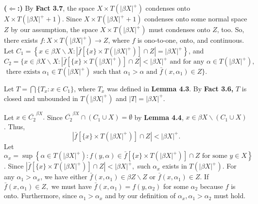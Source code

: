 \documentclass{article}
\begin{document}
																																				  \vskip 20pt

																																				  \textbf{($\Leftarrow$:)} By \textbf{Fact 3.7}, the space $X\times T(|\beta X|^+)$ condenses onto $X\times T(|\beta X|^+ +1).$ 
																																				  Since $X\times T(|\beta X|^+ +1)$ condenses onto some normal space $Z$ by our assumption, the space $X\times T(|\beta X|^+)$ must condenses onto $Z$, too. 
																																				  So, there exists $f: X\times T(|\beta X|^+) \rightarrow Z$, where $f$ is ono-to-one, onto, and continuous. 
																																				  Let \vskip 10pt
																																				  $C_1=\left\{x\in  \beta X \backslash X: |\bar{f}[\{x\} \times T(|\beta X|^+)] \cap Z|=|\beta X|^+\right\}$, and \vskip 10pt
																																				  $C_2=\{x\in \beta X\backslash X: \left|\bar{f}[\{x\}\times T(|\beta X|^+)]\cap Z\right|<|\beta X|^+ \mbox{ and for any }\alpha\in T(|\beta X|^+),$\\ $\mbox{ there exists }\alpha_1\in T(|\beta X|^+)\mbox{ such that }\alpha_1 >\alpha \mbox{ and } \bar{f}(x,\alpha_1) \in Z \}.$

																																				  \vskip 15pt
																																				  Let $T=\bigcap\{T_x:x\in C_1\}$, where $T_x$ was defined in \textbf{Lemma 4.3}. By \textbf{Fact 3.6,} $T$ is closed and unbounded in $T(|\beta X|^+)$ and $|T|=|\beta X|^+.$

																																				  \vskip 25pt

																																				  Let $x\in \overline{C_2}^{\beta X}.$ Since $\overline{C_2}^{\beta X}\cap (C_1\cup X)=\emptyset$ by \textbf{Lemma 4.4}, $x\in \beta X \backslash (C_1\cup X)$. Thus, $$\left|\bar{f}\left[ \{x\}\times T(|\beta X|^+) \right] \cap Z \right| < |\beta X|^+.$$ 
																																				  Let $\alpha_x=\sup\left\{ \alpha \in T(|\beta X|^+): f(y,\alpha)\in \bar{f}\left[ \{x\}\times T(|\beta X|^+) \right] \cap Z \mbox{ for some } y\in X\right\}$. Since   $\left|\bar{f}\left[ \{x\}\times T(|\beta X|^+) \right] \cap Z \right| < |\beta X|^+,$ such $\alpha_x$ exists in $T(|\beta X|^+)$. 
																																				  For any $\alpha_1 > \alpha_x$, we have either $\bar{f}(x,\alpha_1)\in \beta Z \backslash Z$ or $\bar{f}(x,\alpha_1)\in Z$. If $\bar{f}(x,\alpha_1)\in Z,$ we must have $\bar{f}(x,\alpha_1)=f(y,\alpha_2)$ for some $\alpha_2$ because $f$ is onto. Furthermore, since $\alpha_1>\alpha_x$ and by our definition of $\alpha_x, \alpha_1>\alpha_2$ must hold.
																																				  \vskip 15pt
\end{document}

